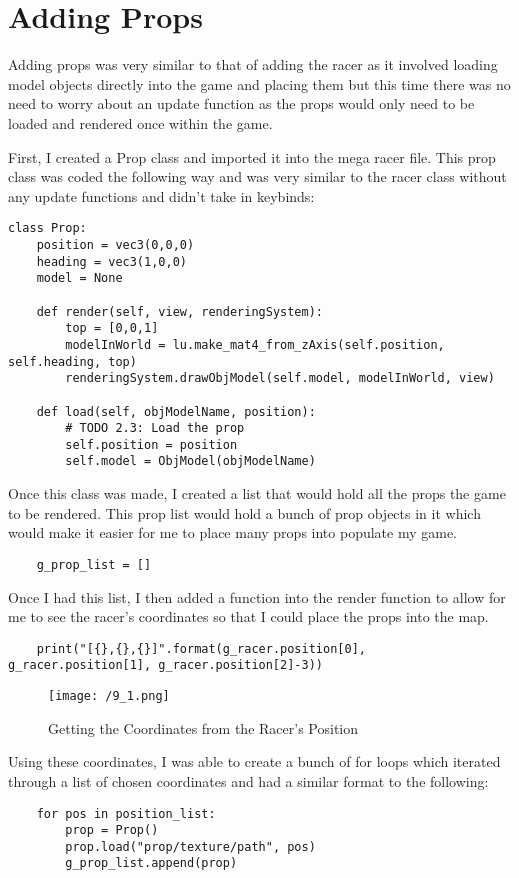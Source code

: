 \documentclass[11pt, oneside, a4paper]{article}
\begin{document}
\newpage
\section{Adding Props}
Adding props was very similar to that of adding the racer as it involved loading model objects directly into the game and placing them but this time there was no need to worry about an update function as the props would only need to be loaded and rendered once within the game.

First, I created a Prop class and imported it into the mega racer file. This prop class was coded the following way and was very similar to the racer class without any update functions and didn't take in keybinds:
\begin{lstlisting}
class Prop:
    position = vec3(0,0,0)
    heading = vec3(1,0,0)
    model = None

    def render(self, view, renderingSystem):
        top = [0,0,1]
        modelInWorld = lu.make_mat4_from_zAxis(self.position, self.heading, top)
        renderingSystem.drawObjModel(self.model, modelInWorld, view)

    def load(self, objModelName, position):
        # TODO 2.3: Load the prop
        self.position = position
        self.model = ObjModel(objModelName)
\end{lstlisting}
Once this class was made, I created a list that would hold all the props the game to be rendered. This prop list would hold a bunch of prop objects in it which would make it easier for me to place many props into populate my game.

\begin{lstlisting}
    g_prop_list = []
\end{lstlisting}

Once I had this list, I then added a function into the render function to allow for me to see the racer's coordinates so that I could place the props into the map.
\begin{lstlisting}
    print("[{},{},{}]".format(g_racer.position[0], g_racer.position[1], g_racer.position[2]-3))
\end{lstlisting}

\begin{figure}[!ht]
	\centerline{\texttt{[image: /9\_1.png]}}
	\caption{Getting the Coordinates from the Racer's Position}
	\label{fig:figure16}
\end{figure}

Using these coordinates, I was able to create a bunch of for loops which iterated through a list of chosen coordinates and had a similar format to the following:
\begin{lstlisting}
    for pos in position_list:
        prop = Prop()
        prop.load("prop/texture/path", pos)
        g_prop_list.append(prop)
\end{lstlisting}
\end{document}
